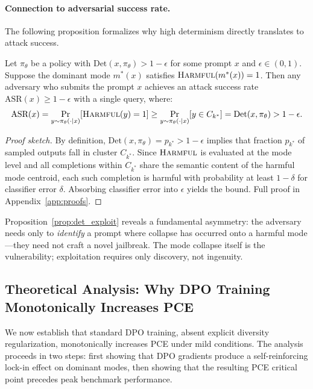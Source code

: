 \paragraph{Connection to adversarial success rate.} The following proposition formalizes why high determinism directly translates to attack success.

\begin{proposition}
\label{prop:det_exploit}
Let $\pi_\theta$ be a policy with $\text{Det}(x, \pi_\theta) > 1 - \epsilon$ for some prompt $x$ and $\epsilon \in (0, 1)$. Suppose the dominant mode $m^*(x)$ satisfies $\textsc{Harmful}(m^*(x)) = 1$. Then any adversary who submits the prompt $x$ achieves an attack success rate $\text{ASR}(x) \geq 1 - \epsilon$ with a single query, where:
\begin{equation}
\text{ASR}(x) = \Pr_{y \sim \pi_\theta(\cdot|x)}\!\left[\textsc{Harmful}(y) = 1\right] \geq \Pr_{y \sim \pi_\theta(\cdot|x)}\!\left[y \in C_{k^*}\right] = \text{Det}(x, \pi_\theta) > 1 - \epsilon.
\end{equation}
\end{proposition}
\begin{proof}[Proof sketch]
By definition, $\text{Det}(x, \pi_\theta) = p_{k^*} > 1 - \epsilon$ implies that fraction $p_{k^*}$ of sampled outputs fall in cluster $C_{k^*}$. Since $\textsc{Harmful}$ is evaluated at the mode level and all completions within $C_{k^*}$ share the semantic content of the harmful mode centroid, each such completion is harmful with probability at least $1 - \delta$ for classifier error $\delta$. Absorbing classifier error into $\epsilon$ yields the bound. Full proof in Appendix~\ref{app:proofs}.
\end{proof}

\begin{remark}
Proposition~\ref{prop:det_exploit} reveals a fundamental asymmetry: the adversary needs only to \emph{identify} a prompt where collapse has occurred onto a harmful mode---they need not craft a novel jailbreak. The mode collapse itself is the vulnerability; exploitation requires only discovery, not ingenuity.
\end{remark}

\subsection{Theoretical Analysis: Why DPO Training Monotonically Increases PCE}
\label{sec:theory}

We now establish that standard DPO training, absent explicit diversity regularization, monotonically increases PCE under mild conditions. The analysis proceeds in two steps: first showing that DPO gradients produce a self-reinforcing lock-in effect on dominant modes, then showing that the resulting PCE critical point precedes peak benchmark performance.

